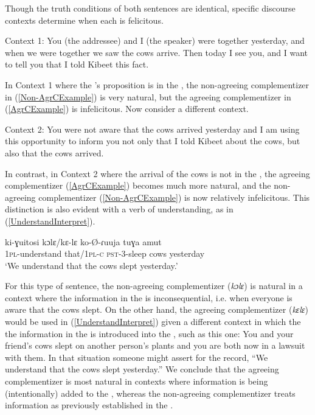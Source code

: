 \documentclass[output=paper,newtxmath,modfonts,nonflat,hidelinks]{langsci/langscibook}
\begin{document}
\noindent Though the  truth conditions of both sentences are identical, specific discourse contexts determine when each is felicitous. 

\ea Context 1: You (the addressee) and I (the speaker) were together yesterday, and when we were together we saw the cows arrive. Then today I see you, and I want to tell you that I told Kibeet this fact.  
\z

\noindent In Context 1 where the 's proposition is in the , the non-agreeing complementizer in (\ref{Non-AgrCExample}) is very natural, but the agreeing complementizer in (\ref{AgrCExample}) is infelicitous. Now consider a different context.

\ea Context 2: You were not aware that the cows arrived yesterday and I am using this opportunity to inform you not only that I told Kibeet about the cows, but also that the cows arrived.
\z

\noindent In contrast, in Context 2 where the arrival of the cows is not in the , the agreeing complementizer (\ref{AgrCExample}) becomes much more natural, and the non-agreeing complementizer (\ref{Non-AgrCExample}) is now relatively infelicitous. This distinction is also evident with a verb of understanding, as in (\ref{UnderstandInterpret}). 

\ea \label{UnderstandInterpret}
\gll ki-ɣuitosi kɔlɛ/kɛ-lɛ ko-\O-ɾuuja tuɣa amut \\
1\textsc{pl}-understand that/1\textsc{pl-c} \textsc{pst}-3-sleep cows yesterday \\
\glt `We understand that the cows slept yesterday.'
\z

\noindent For this type of sentence, the non-agreeing complementizer (\textit{kɔlɛ}) is natural in a context where the information in the  is inconsequential, i.e. when everyone is aware that the cows slept. On the other hand, the agreeing complementizer (\textit{kɛlɛ}) would be used in (\ref{UnderstandInterpret}) given a different context in which the the information in the  is introduced into the , such as this one: You and your friend's cows slept on another person's plants and you are both now in a lawsuit with them. In that situation someone might assert for the record, ``We understand that the cows slept yesterday.'' We conclude that the agreeing complementizer is most natural in contexts where information is being (intentionally) added to the , whereas the non-agreeing complementizer treats information as previously established in the .
\end{document}
